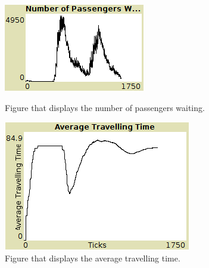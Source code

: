 \begin{figure}[htbp]
\centering
\begin{minipage}{.48\textwidth}
  \includegraphics[width=\linewidth]{src/nr_pass_waiting.png}
  \caption{\label{fig:pass_waiting}Figure that displays the number of passengers waiting.}
\end{minipage}%
\begin{minipage}{.48\textwidth}
  \includegraphics[width=\linewidth]{src/avg_tt.png}
  \caption{\label{fig:avg_tt}Figure that displays the average travelling time.}
\end{minipage}
\end{figure}
